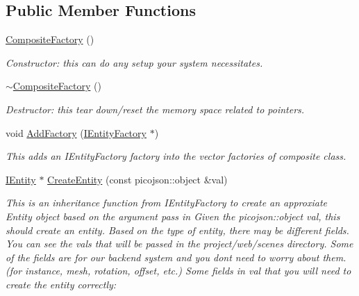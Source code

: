 \subsection*{Public Member Functions}
\begin{DoxyCompactItemize}
\item 
\mbox{\label{classcsci3081_1_1CompositeFactory_a4f7bb7bd2003311b131b2c346d0dc02e}} 
\hyperlink{classcsci3081_1_1CompositeFactory_a4f7bb7bd2003311b131b2c346d0dc02e}{Composite\+Factory} ()
\begin{DoxyCompactList}\small\item\em Constructor\+: this can do any setup your system necessitates. \end{DoxyCompactList}\item 
\mbox{\label{classcsci3081_1_1CompositeFactory_a6b29e079c772c7068e6fe789f0298297}} 
\hyperlink{classcsci3081_1_1CompositeFactory_a6b29e079c772c7068e6fe789f0298297}{$\sim$\+Composite\+Factory} ()
\begin{DoxyCompactList}\small\item\em Destructor\+: this tear down/reset the memory space related to pointers. \end{DoxyCompactList}\item 
void \hyperlink{classcsci3081_1_1CompositeFactory_a3aa41268f20303f8e6f5e2a1d2422e0a}{Add\+Factory} (\hyperlink{classentity__project_1_1IEntityFactory}{I\+Entity\+Factory} $\ast$)
\begin{DoxyCompactList}\small\item\em This adds an I\+Entity\+Factory factory into the vector factories of composite class. \end{DoxyCompactList}\item 
\hyperlink{classentity__project_1_1IEntity}{I\+Entity} $\ast$ \hyperlink{classcsci3081_1_1CompositeFactory_a2933003742d1660515c009ec04b8d5b4}{Create\+Entity} (const picojson\+::object \&val)
\begin{DoxyCompactList}\small\item\em This is an inheritance function from I\+Entity\+Factory to create an approxiate Entity object based on the argument pass in Given the picojson\+::object val, this should create an entity. Based on the type of entity, there may be different fields. You can see the vals that will be passed in the project/web/scenes directory. Some of the fields are for our backend system and you don\textquotesingle{}t need to worry about them. (for instance, mesh, rotation, offset, etc.) Some fields in val that you will need to create the entity correctly\+: \end{DoxyCompactList}\end{DoxyCompactItemize}


